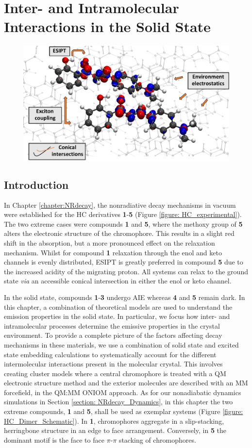 \chapter[Inter- and Intramolecular Interactions in the Solid State]{Inter- and Intramolecular Interactions in the Solid State}
\label{chapter: Inter}
\begin{figure}[H]
\centering
  \includegraphics[width=0.6\linewidth]{4IntraInterInteractions/2toc.pdf}
\end{figure}
\section{Introduction}\label{section: Inter_Introduction}
In Chapter \ref{chapter:NRdecay}, the nonradiative decay mechanisms in vacuum were established for the \ac{HC} derivatives \textbf{1}-\textbf{5} (Figure \ref{figure: HC_experimental}). The two extreme cases were compounds \textbf{1} and \textbf{5}, where the methoxy group of \textbf{5} alters the electronic structure of the chromophore. This results in a slight red shift in the absorption, but a more pronounced effect on the relaxation mechanism. Whilst for compound \textbf{1} relaxation through the enol and keto channels is evenly distributed, ESIPT is greatly preferred in compound \textbf{5} due to the increased acidity of the migrating proton. All systems can relax to the ground state \textit{via} an accessible conical intersection in either the enol or keto channel.

In the solid state, compounds \textbf{1}-\textbf{3} undergo \ac{AIE} whereas \textbf{4} and \textbf{5} remain dark. In this chapter, a combination of theoretical models are used to understand the emission properties in the solid state. In particular, we focus how inter- and intramolecular processes determine the emissive properties in the crystal environment. To provide a complete picture of the factors affecting decay mechanisms in these materials, we use a combination of solid state and excited state embedding calculations to systematically account for the different intermolecular interactions present in the molecular crystal. This involves creating cluster models where a central chromophore is treated with a QM electronic structure method and the exterior molecules are described with an \ac{MM} forcefield, in the QM:MM ONIOM approach. As for our nonadiabatic dynamics simulations in Section \ref{section: NRdecay_Dynamics}, in this chapter the two extreme compounds, \textbf{1} and \textbf{5}, shall be used as exemplar systems (Figure \ref{figure: HC_Dimer_Schematic}). In \textbf{1}, chromophores aggregate in a slip-stacking, herringbone structure in an edge to face arrangement. Conversely, in \textbf{5} the dominant motif is the face to face $\pi$-$\pi$ stacking of chromophores.

